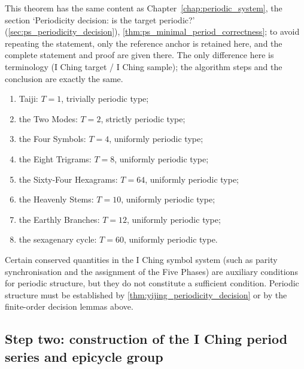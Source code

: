 \begin{theorem}\label{thm:yijing_minimal_period_correctness}
This theorem has the same content as Chapter~\ref{chap:periodic_system}, the section `Periodicity decision: is the target periodic?' (\cref{sec:ps_periodicity_decision}), \cref{thm:ps_minimal_period_correctness}; to avoid repeating the statement, only the reference anchor is retained here, and the complete statement and proof are given there. The only difference here is terminology (I Ching target / I Ching sample); the algorithm steps and the conclusion are exactly the same.
\end{theorem}

\begin{example}\label{ex:yijing_taiji_to_64}
\leavevmode\par
\begin{enumerate}[label=(\roman*)]
    \item Taiji: $T=1$, trivially periodic type;
    \item the Two Modes: $T=2$, strictly periodic type;
    \item the Four Symbols: $T=4$, uniformly periodic type;
    \item the Eight Trigrams: $T=8$, uniformly periodic type;
    \item the Sixty-Four Hexagrams: $T=64$, uniformly periodic type;
    \item the Heavenly Stems: $T=10$, uniformly periodic type;
    \item the Earthly Branches: $T=12$, uniformly periodic type;
    \item the sexagenary cycle: $T=60$, uniformly periodic type.
\end{enumerate}
\end{example}

\begin{remark}\label{rem:yijing_invariant_not_period}
Certain conserved quantities in the I Ching symbol system (such as parity synchronisation and the assignment of the Five Phases) are auxiliary conditions for periodic structure, but they do not constitute a sufficient condition. Periodic structure must be established by \cref{thm:yijing_periodicity_decision} or by the finite-order decision lemmas above.
\end{remark}

\subsection{Step two: construction of the I Ching period series and epicycle group}

